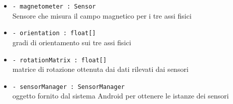 \documentclass[../DefinizioneDiProdotto.tex]{subfiles}
\begin{document}
\begin{description}
\begin{itemize}
		\item \texttt{- magnetometer : Sensor}\\
		Sensore che misura il campo magnetico per i tre assi fisici
		
		\item \texttt{- orientation : float[]}\\
		gradi di orientamento sui tre assi fisici
		
		\item \texttt{- rotationMatrix : float[]}\\
		matrice di rotazione ottenuta dai dati rilevati dai sensori
		
		\item \texttt{- sensorManager : SensorManager}\\
		oggetto fornito dal sistema Android per ottenere le istanze dei sensori
		

\end{itemize}
\end{description}
\end{document}
